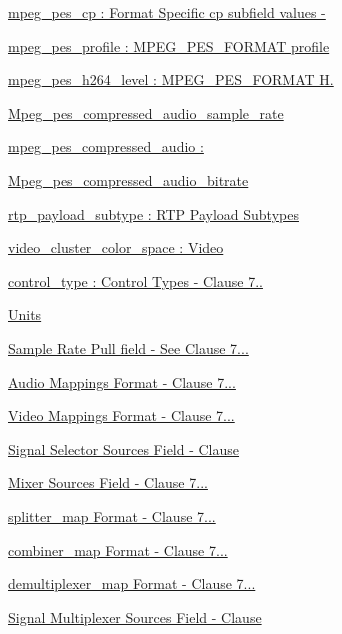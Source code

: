 \begin{DoxyCompactItemize}
\item 
\hyperlink{group__mpeg__pes__cp}{mpeg\+\_\+pes\+\_\+cp \+: Format Specific cp subfield values -\/}
\item 
\hyperlink{group__mpeg__pes__profile}{mpeg\+\_\+pes\+\_\+profile \+: M\+P\+E\+G\+\_\+\+P\+E\+S\+\_\+\+F\+O\+R\+M\+A\+T profile}
\item 
\hyperlink{group__mpeg__pes__h264__level}{mpeg\+\_\+pes\+\_\+h264\+\_\+level \+: M\+P\+E\+G\+\_\+\+P\+E\+S\+\_\+\+F\+O\+R\+M\+A\+T H.}
\item 
\hyperlink{group__mpeg__pes__compressed__audio__sample__rate}{Mpeg\+\_\+pes\+\_\+compressed\+\_\+audio\+\_\+sample\+\_\+rate}
\item 
\hyperlink{group__mpeg__pes__compressed__audio}{mpeg\+\_\+pes\+\_\+compressed\+\_\+audio \+:}
\item 
\hyperlink{group__mpeg__pes__compressed__audio__bitrate}{Mpeg\+\_\+pes\+\_\+compressed\+\_\+audio\+\_\+bitrate}
\item 
\hyperlink{group__rtp__payload__subtype}{rtp\+\_\+payload\+\_\+subtype \+: R\+T\+P Payload Subtypes}
\item 
\hyperlink{group__video__cluster__color__space}{video\+\_\+cluster\+\_\+color\+\_\+space \+: Video}
\item 
\hyperlink{group__control__type}{control\+\_\+type \+: Control Types -\/ Clause 7..}
\item 
\hyperlink{group__units}{Units}
\item 
\hyperlink{group__pull}{Sample Rate Pull field -\/ See Clause 7...}
\item 
\hyperlink{group__audio__mapping}{Audio Mappings Format -\/ Clause 7...}
\item 
\hyperlink{group__video__mapping}{Video Mappings Format -\/ Clause 7...}
\item 
\hyperlink{group__signal__selector__source}{Signal Selector Sources Field -\/ Clause}
\item 
\hyperlink{group__mixer__source}{Mixer Sources Field -\/ Clause 7...}
\item 
\hyperlink{group__splitter__map}{splitter\+\_\+map Format -\/ Clause 7...}
\item 
\hyperlink{group__combiner__map}{combiner\+\_\+map Format -\/ Clause 7...}
\item 
\hyperlink{group__demultiplexer__map}{demultiplexer\+\_\+map Format -\/ Clause 7...}
\item 
\hyperlink{group__multiplexer__source}{Signal Multiplexer Sources Field -\/ Clause}

\end{DoxyCompactItemize}
